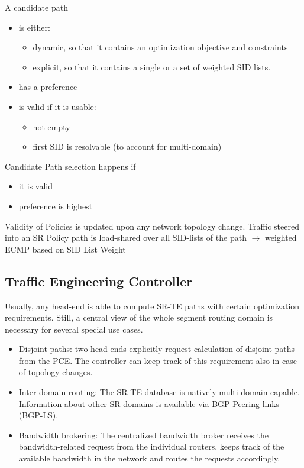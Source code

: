 \noindent
A candidate path
\begin{itemize}
    \item is either:
    \begin{itemize}
        \item dynamic, so that it contains an optimization objective and constraints
        \item explicit, so that it contains a single or a set of weighted SID lists.
    \end{itemize}
    \item has a preference
    \item is valid if it is usable:
    \begin{itemize}
        \item not empty
        \item first SID is resolvable (to account for multi-domain)
    \end{itemize}
\end{itemize}

\noindent
Candidate Path selection happens if 
\begin{itemize}
    \item it is valid 
    \item preference is highest    
\end{itemize}

\noindent
Validity of Policies is updated upon any network topology change.
Traffic steered into an SR Policy path is load-shared over all SID-lists of the path $\rightarrow$ weighted ECMP based on SID List Weight 

\subsection{Traffic Engineering Controller}
Usually, any head-end is able to compute SR-TE paths with certain optimization requirements. Still, a central view of the whole segment routing domain is necessary for several special use cases.
\begin{itemize}
    \item Disjoint paths: two head-ends explicitly request calculation of disjoint paths from the PCE. The controller can keep track of this requirement also in case of topology changes.  
    \item Inter-domain routing: The SR-TE database is natively multi-domain capable. Information about other SR domains is available via BGP Peering links (BGP-LS).
    \item Bandwidth brokering: The centralized bandwidth broker receives the bandwidth-related request from the individual routers, keeps
    track of the available bandwidth in the network and routes the requests accordingly.
\end{itemize}

